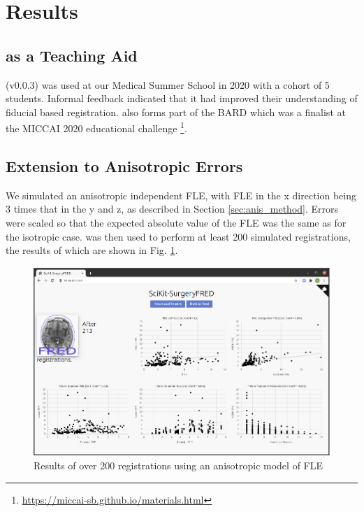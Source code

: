 \section{Results}
\subsection{\fred as a Teaching Aid}

\fred (v0.0.3)\cite{stephen_thompson_2020_3946090} was used at our Medical Summer School in 2020 with a cohort of 5 students. Informal feedback indicated that it had improved their
understanding
of fiducial based registration. \fred also forms part of the \gls{BARD} which 
was a finalist at the MICCAI 2020 educational challenge 
\footnote{\href{https://miccai-sb.github.io/materials.html}{https://miccai-sb.github.io/materials.html}}. 

\subsection{Extension to Anisotropic Errors}
We simulated an anisotropic independent \gls{FLE}, with \gls{FLE} in the x 
direction being 3 times that in the y and z, as described in Section \ref{sec:anis_method}.
Errors were scaled so that the 
expected absolute value of the \gls{FLE} was the same as for the isotropic case. 
\fred was then used to perform at least 200 simulated registrations, the results of
which are shown in Fig. \ref{fig:anis_error}. 

\begin{figure}
	\begin{center}
			\includegraphics[width=0.9\linewidth]{images/anisitropic_error.eps}
		\caption{\label{fig:anis_error}Results of over 200 registrations using an anisotropic model of {FLE}}
	\end{center}
\end{figure}

